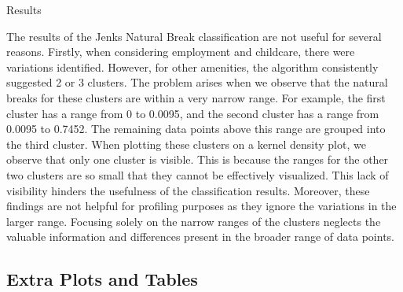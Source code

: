 \documentclass[11pt, a4paper]{article}
\begin{document}
Results



The results of the Jenks Natural Break classification are not useful for several reasons. Firstly, when considering employment and childcare, there were variations identified. However, for other amenities, the algorithm consistently suggested 2 or 3 clusters. The problem arises when we observe that the natural breaks for these clusters are within a very narrow range. For example, the first cluster has a range from 0 to 0.0095, and the second cluster has a range from 0.0095 to 0.7452. The remaining data points above this range are grouped into the third cluster. When plotting these clusters on a kernel density plot, we observe that only one cluster is visible. This is because the ranges for the other two clusters are so small that they cannot be effectively visualized. This lack of visibility hinders the usefulness of the classification results.
Moreover, these findings are not helpful for profiling purposes as they ignore the variations in the larger range. Focusing solely on the narrow ranges of the clusters neglects the valuable information and differences present in the broader range of data points.














\pagebreak 
\subsection{Extra Plots and Tables}\label{extra}
\end{document}
